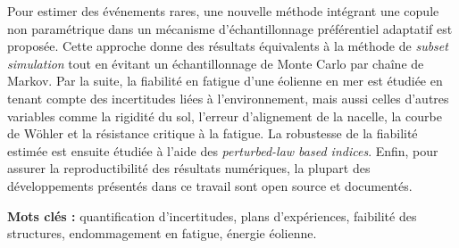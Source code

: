 {Pour estimer des \'{e}v\'{e}nements rares, une nouvelle m\'{e}thode int\'{e}grant une copule non param\'{e}trique dans un m\'{e}canisme d'\'{e}chantillonnage pr\'{e}f\'{e}rentiel adaptatif est propos\'{e}e. 
Cette approche donne des r\'{e}sultats \'{e}quivalents à la m\'{e}thode de \textit{subset simulation} tout en \'{e}vitant un \'{e}chantillonnage de Monte Carlo par chaîne de Markov. 
Par la suite, la fiabilit\'{e} en fatigue d'une \'{e}olienne en mer est \'{e}tudi\'{e}e en tenant compte des incertitudes li\'{e}es à l'environnement, mais aussi celles d'autres variables comme la rigidit\'{e} du sol, l'erreur d'alignement de la nacelle, la courbe de W\"{o}hler et la r\'{e}sistance critique à la fatigue. 
La robustesse de la fiabilit\'{e} estim\'{e}e est ensuite \'{e}tudi\'{e}e à l'aide des \textit{perturbed-law based indices}. 
Enfin, pour assurer la reproductibilit\'{e} des r\'{e}sultats num\'{e}riques, la plupart des d\'{e}veloppements pr\'{e}sent\'{e}s dans ce travail sont open source et document\'{e}s.

\vspace*{1cm}
\noindent
\textbf{Mots cl\'{e}s :} quantification d'incertitudes, plans d'exp\'{e}riences, faibilit\'{e} des structures, endommagement en fatigue, \'{e}nergie \'{e}olienne.
}